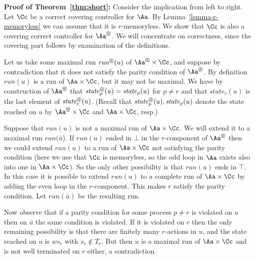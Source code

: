 \documentclass[10pt,a4paper]{article}
\newcommand{\run}{\mathit{run}}
\newcommand{\short}[1]{#1^\circledS}
\newcommand{\state}{\mathit{state}}
\begin{document}
\medskip

\textbf{Proof of Theorem~\ref{thm:short}:}
  Consider the implication from left to right.
  Let $\Cc$ be a correct covering controller for $\Aa$. 
  By Lemma~\ref{lemma-r-memoryless} we can assume that it is $r$-memoryless. 
  We show that $\Cc$ is also a covering correct controller for
  $\short\Aa$. We will concentrate on correctness, since the covering part
  follows by examination of the definitions. 

  Let us take some maximal run $\short\run(u)$ of $\short\Aa\times
  \Cc$, and suppose by contradiction that it does not satisfy the
  parity condition of $\short\Aa$.  By definition $\run(u)$ is a run
  of $\Aa\times\Cc$, but it may not be maximal. We have by
  construction of $\short\Aa$ that $\short\state_p(u)=\state_p(u)$ for
  $p\not=r$ and that $\state_r(u)$ is the last element of
  $\short\state_r(u)$. (Recall that $\short\state_p(u),\state_p(u)$
  denote the state reached on $u$ by 
  $\short\Aa\times \Cc$ and $\Aa\times \Cc$, resp.)

  Suppose that $\run(u)$ is not a maximal run of $\Aa\times \Cc$. We will
  extend it to a maximal run $\run(\bar u$). If $\run(u)$ ended in $\bot$ in the
  $r$-component of $\short \Aa$ then we could extend $\run(u)$ to a run of
  $\Aa\times\Cc$ not satisfying the parity condition (here we use that
  $\Cc$ is memoryless, so the odd loop in $\Aa$ exists also into one in $\Aa
  \times \Cc$). So the only
  other possibility is that $\run(u)$ ends in $\top$.  In this case it is
  possible to extend $\run(u)$ to a complete run of $\Aa\times\Cc$ by adding
  the even loop in the $r$-component. This makes $r$
  satisfy the parity condition. Let $\run(\bar u)$ be the resulting run.

  Now observe that if a parity condition for some process $p\not=r$ is
  violated on $u$ then on $\bar u$ the same condition is violated. If
  it is violated on $r$ then the only remaining possibility is that
  there are finitely many $r$-actions in $u$, and the state reached on
  $u$ is $ws_r$ with $s_r\not\in T_r$. But then $u$ is a maximal run
  of $\Aa \times \Cc$ and is not well terminated on $r$ either, a
  contradiction.
\end{document}
